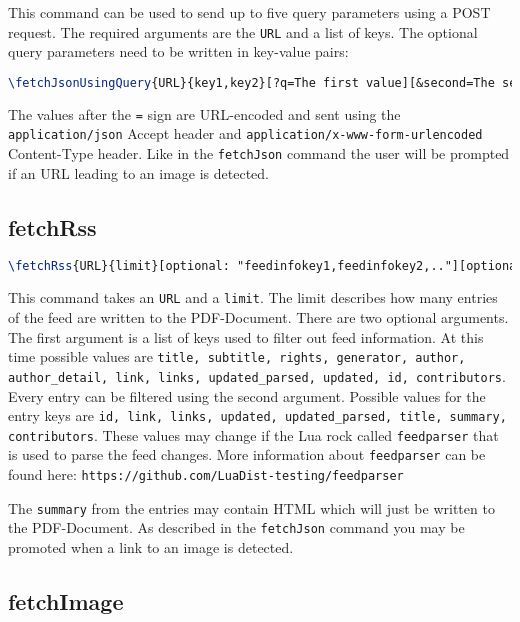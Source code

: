 \documentclass[11pt]{article}
\begin{document}
This command can be used to send up to five query parameters using a POST request. The required arguments are the \texttt{URL} and a list of keys. The optional query parameters need to be written in key-value pairs:

\begin{lstlisting}[language=tex]
\fetchJsonUsingQuery{URL}{key1,key2}[?q=The first value][&second=The second value and so on"]
\end{lstlisting}

The values after the \texttt{=} sign are URL-encoded and sent using the \lstinline{application/json} Accept header and \texttt{application/x-www-form-urlencoded} Content-Type header. Like in the \texttt{fetchJson} command the user will be prompted if an URL leading to an image is detected.

\subsection{fetchRss}

\begin{lstlisting}[language=tex]
\fetchRss{URL}{limit}[optional: "feedinfokey1,feedinfokey2,.."][optional: "entrykey1,entrykey2,.."]
\end{lstlisting}

This command takes an \texttt{URL} and a \texttt{limit}. The limit describes how many entries of the feed are written to the PDF-Document. There are two optional arguments. The first argument is a list of keys used to filter out feed information. At this time possible values are \texttt{title, subtitle, rights, generator, author, author\_detail, link, links, updated\_parsed, updated, id, contributors}. Every entry can be filtered using the second argument. Possible values for the entry keys are \texttt{id, link, links, updated, updated\_parsed, title, summary, contributors}. These values may change if the Lua rock called \texttt{feedparser} that is used to parse the feed changes. More information about \texttt{feedparser} can be found here: \lstinline{https://github.com/LuaDist-testing/feedparser}

The \texttt{summary} from the entries may contain HTML which will just be written to the PDF-Document. As described in the \texttt{fetchJson} command you may be promoted when a link to an image is detected.


\subsection{fetchImage}
\end{document}

